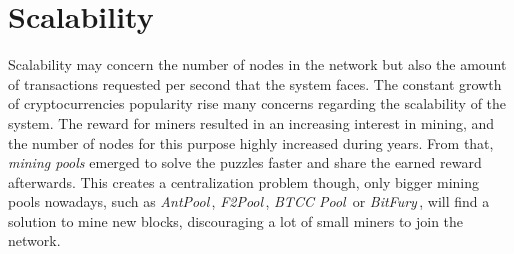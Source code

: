 \documentclass[USenglish]{uit-thesis}
\begin{document}







\section{Scalability}
\label{sec:scalability}
Scalability may concern the number
of nodes in the network but also
the amount of transactions requested
per second that the system faces.
The constant growth of
cryptocurrencies popularity rise
many concerns regarding the scalability
of the system. The reward for miners
resulted in an increasing interest in mining, and
the number of nodes for this purpose highly increased
during years.
From that, \emph{mining pools} emerged to solve
the puzzles faster and share the earned reward afterwards.
This creates a centralization problem though, only bigger
mining pools nowadays, such as \emph{AntPool}\,\cite{antpool},
\emph{F2Pool}\,\cite{f2pool},
\emph{BTCC Pool}\,\cite{btcc} or \emph{BitFury}\,\cite{bitfury},
will find a solution to mine new blocks, discouraging a lot of small miners
to join the network.
\end{document}
